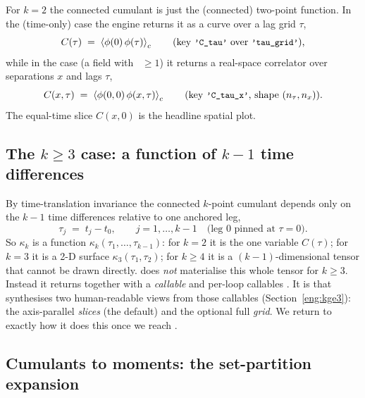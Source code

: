 For $k=2$ the connected cumulant is just the (connected) two-point function. In
the  (time-only) case the engine returns it as a curve over a lag
grid $\tau$,
\begin{equation}
  C(\tau) \;=\; \left\langle \phi(0)\,\phi(\tau) \right\rangle_c
  \qquad\text{(key \texttt{\small 'C\_tau'} over \texttt{\small 'tau\_grid'}),}
\end{equation}
while in the  case (a field with ~$\ge 1$) it
returns a real-space correlator over separations $x$ and lags $\tau$,
\begin{equation}
  C(x,\tau) \;=\; \left\langle \phi(0,0)\,\phi(x,\tau) \right\rangle_c
  \qquad\text{(key \texttt{\small 'C\_tau\_x'}, shape $(n_\tau, n_x)$).}
\end{equation}
The equal-time slice $C(x,0)$ is the headline spatial plot.

\subsection{The \texorpdfstring{$k\ge 3$}{k>=3} case: a function of \texorpdfstring{$k-1$}{k-1} time differences}

By time-translation invariance the connected $k$-point cumulant depends only on
the $k-1$ time differences relative to one anchored leg,
\begin{equation}
  \tau_j \;=\; t_j - t_0, \qquad j = 1,\ldots,k-1 \quad\text{(leg 0 pinned at $\tau=0$).}
\end{equation}
So $\kappa_k$ is a function $\kappa_k(\tau_1,\ldots,\tau_{k-1})$: for $k=2$ it is
the one variable $C(\tau)$; for $k=3$ it is a 2-D surface $\kappa_3(\tau_1,\tau_2)$;
for $k\ge 4$ it is a $(k-1)$-dimensional tensor that cannot be drawn directly.
 does \emph{not} materialise this whole tensor for
$k\ge 3$. Instead it returns  together with a \emph{callable}
 and per-loop callables . It is  that synthesises two human-readable views from those
callables (Section~\ref{eng:kge3}): the axis-parallel \emph{slices} (the default)
and the optional full \emph{grid}. We return to exactly how it does this once we
reach .

\subsection{Cumulants to moments: the set-partition expansion}\label{sec:math-moments}

